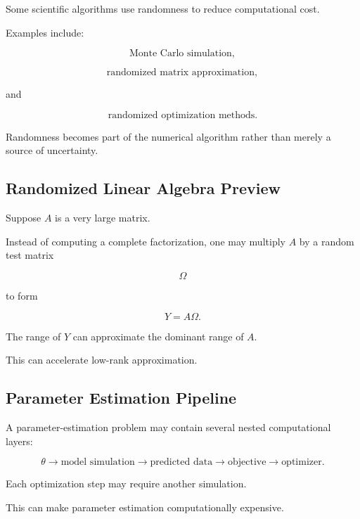 Some scientific algorithms use randomness to reduce computational cost.

Examples include:

\[
\boxed{
\text{Monte Carlo simulation},
}
\]

\[
\boxed{
\text{randomized matrix approximation},
}
\]

and

\[
\boxed{
\text{randomized optimization methods}.
}
\]

Randomness becomes part of the numerical algorithm rather than merely a
source of uncertainty.

\subsection{Randomized Linear Algebra Preview}
\label{subsec:randomized-linear-algebra}

Suppose \(A\) is a very large matrix.

Instead of computing a complete factorization, one may multiply \(A\) by
a random test matrix

\[
\boxed{
\Omega
}
\]

to form

\[
\boxed{
Y=A\Omega.
}
\]

The range of \(Y\) can approximate the dominant range of \(A\).

This can accelerate low-rank approximation.

\subsection{Parameter Estimation Pipeline}
\label{subsec:parameter-estimation-pipeline}

A parameter-estimation problem may contain several nested computational
layers:

\[
\boxed{
\theta
\rightarrow
\text{model simulation}
\rightarrow
\text{predicted data}
\rightarrow
\text{objective}
\rightarrow
\text{optimizer}.
}
\]

Each optimization step may require another simulation.

This can make parameter estimation computationally expensive.

